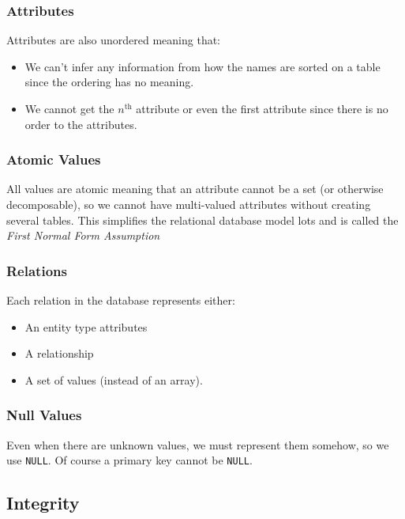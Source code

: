 \subsubsection{Attributes}\label{ssub:attributes}

Attributes are also unordered meaning that:
\begin{itemize}
    \item We can't infer any information from how the names are sorted on a table since the ordering has no meaning.
    \item We cannot get the \(n^\text{th}\) attribute or even the first attribute since there is no order to the attributes.
\end{itemize}

\subsubsection{Atomic Values}\label{ssub:atomic_values}

All values are atomic meaning that an attribute cannot be a set (or otherwise decomposable), so we cannot have multi-valued attributes without creating several tables.
This simplifies the relational database model lots and is called the \emph{First Normal Form Assumption}

\subsubsection{Relations}\label{ssub:relations}

Each relation in the database represents either:
\begin{itemize}
    \item An entity type attributes
    \item A relationship
    \item A set of values (instead of an array).
\end{itemize}

\subsubsection{Null Values}\label{ssub:null_values}

Even when there are unknown values, we must represent them somehow, so we use \texttt{NULL}.
Of course a primary key cannot be \texttt{NULL}.

\subsection{Integrity}\label{sub:integrity}

